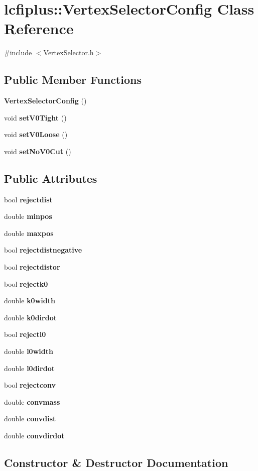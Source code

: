 \section{lcfiplus\-:\-:Vertex\-Selector\-Config Class Reference}
\label{classlcfiplus_1_1VertexSelectorConfig}


{\ttfamily \#include $<$Vertex\-Selector.\-h$>$}

\subsection*{Public Member Functions}
\begin{DoxyCompactItemize}
\item 
{\bf Vertex\-Selector\-Config} ()
\item 
void {\bf set\-V0\-Tight} ()
\item 
void {\bf set\-V0\-Loose} ()
\item 
void {\bf set\-No\-V0\-Cut} ()
\end{DoxyCompactItemize}
\subsection*{Public Attributes}
\begin{DoxyCompactItemize}
\item 
bool {\bf rejectdist}
\item 
double {\bf minpos}
\item 
double {\bf maxpos}
\item 
bool {\bf rejectdistnegative}
\item 
bool {\bf rejectdistor}
\item 
bool {\bf rejectk0}
\item 
double {\bf k0width}
\item 
double {\bf k0dirdot}
\item 
bool {\bf rejectl0}
\item 
double {\bf l0width}
\item 
double {\bf l0dirdot}
\item 
bool {\bf rejectconv}
\item 
double {\bf convmass}
\item 
double {\bf convdist}
\item 
double {\bf convdirdot}
\end{DoxyCompactItemize}


\subsection{Constructor \& Destructor Documentation}
